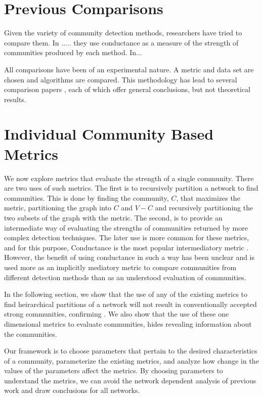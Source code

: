 \documentclass[phd,tocprelim]{cornell}
\begin{document}
\section{Previous Comparisons}

Given the variety of community detection methods, researchers have tried to compare them.  In ..... they use conductance as a measure of the strength of communities produced by each method.   In...

All comparisons have been of an experimental nature.  A metric and data set are chosen and algorithms are compared.  This methodology has lead to several comparison papers \cite{} \cite{} \cite{}, each of which offer general conclusions, but not theoretical results.

\section{Individual Community Based Metrics}

We now explore metrics that evaluate the strength of a single community.  There are two uses of such metrics.  The first is to recursively partition a network to find communities.  This is done by finding the community, $C$, that maximizes the metric, partitioning the graph into $C$ and $V - C$ and recursively partitioning the two subsets of the graph with the metric.  The second, is to provide an intermediate way of evaluating the strengths of communities returned by more complex detection techniques.  The later use is more common for these metrics, and for this purpose, {\sc Conductance} is the most popular intermediatory metric \cite{}.  However, the benefit of using conductance in such a way has been unclear and is used more as an implicitly mediatory metric to compare communities from different detection methods than as an understood evaluation of communities.

In the following section, we show that the use of any of the existing metrics to find heirarchical partitions of a network will not result in conventionally accepted strong communities, confirming \cite{}.  We also show that the use of these one dimensional metrics to evaluate communities, hides revealing information about the communities.

Our framework is to choose parameters that pertain to the desired characteristics of a community, parameterize the existing metrics, and analyze how change in the values of the parameters affect the metrics.  By choosing parameters to understand the metrics, we can avoid the network dependent analysis of previous work \cite{} and draw conclusions for all networks.
\end{document}
